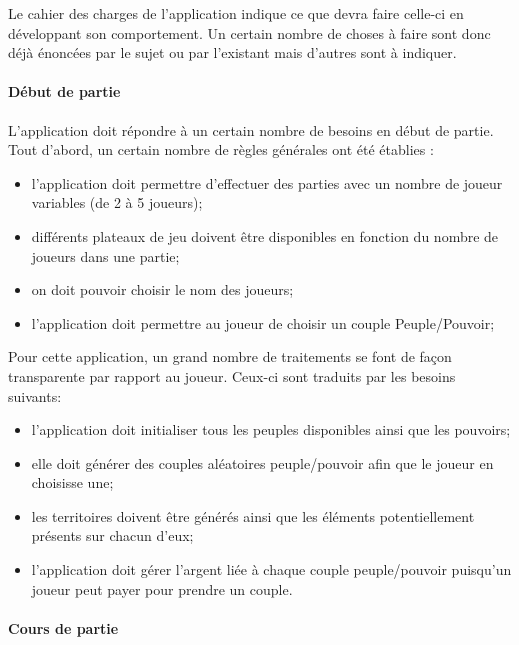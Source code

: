 \documentclass[a4paper, 11pt]{article}
\begin{document}
		Le cahier des charges de l'application indique ce que devra faire celle-ci en développant son comportement. Un certain nombre de choses à faire sont donc déjà énoncées par le sujet ou par l'existant mais d'autres sont à indiquer.
		
			\paragraph{Début de partie}
			
			L'application doit répondre à un certain nombre de besoins en début de partie. \\
			
			Tout d'abord, un certain nombre de règles générales ont été établies :
			\begin{itemize}
				\item l'application doit permettre d'effectuer des parties avec un nombre de joueur variables (de 2 à 5 joueurs);
				\item différents plateaux de jeu doivent être disponibles en fonction du nombre de joueurs dans une partie;
				\item on doit pouvoir choisir le nom des joueurs;
				\item l'application doit permettre au joueur de choisir un couple Peuple/Pouvoir; \\
			\end{itemize}
			
			Pour cette application, un grand nombre de traitements se font de façon transparente par rapport au joueur. Ceux-ci sont traduits par les besoins suivants:
			\begin{itemize}
				\item l'application doit initialiser tous les peuples disponibles ainsi que les pouvoirs;
				\item elle doit générer des couples aléatoires peuple/pouvoir afin que le joueur en choisisse une;
				\item les territoires doivent être générés ainsi que les éléments potentiellement présents sur chacun d'eux;
				\item l'application doit gérer l'argent liée à chaque couple peuple/pouvoir puisqu'un joueur peut payer pour prendre un couple.
			\end{itemize}
			
			\paragraph{Cours de partie}
			
\end{document}
